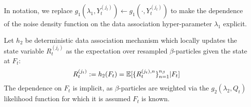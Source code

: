 \begin{defn}
	In notation, we replace $ g_1(\lambda_1, Y_t^{(j_t)}) \gets  g_1(\cdot, Y_t^{(j_t)})$ to make the dependence of the noise density function on the data association hyper-parameter $\lambda_1$ explicit. \\
\end{defn}

\begin{defn}
	 Let $h_2$ be deterministic data association mechanism which locally updates the state variable $R_t^{(j_t)}$ as the expectation over resampled $\beta$-particles given the state at $F_t$:
	 \begin{align}
	 R_t^{(j_t)} := h_2(F_t) = \mathbb{E}[\{R_t^{(j_t), n}\}_{n=1}^{n_\beta} | F_t]
	 \end{align} The dependence on $F_t$ is implicit, as $\beta$-particles are weighted via the $g_2(\lambda_2, Q_t)$ likelihood function for which it is assumed $F_t$ is known.
\end{defn}

